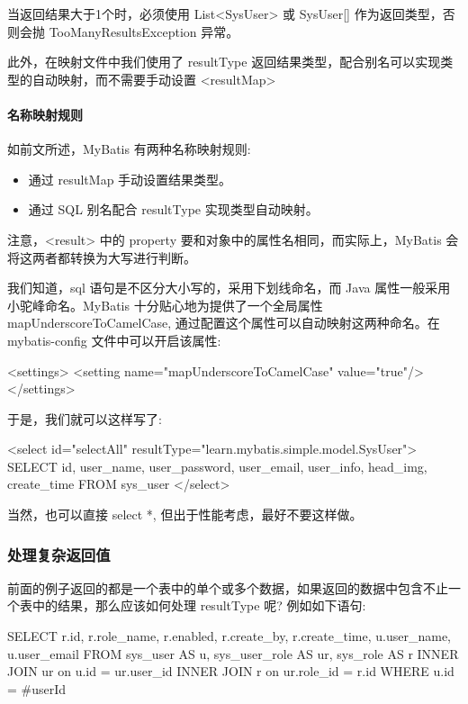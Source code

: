 当返回结果大于1个时，必须使用 List<SysUser> 或 SysUser[] 作为返回类型，否则会抛 TooManyResultsException 异常。 

此外，在映射文件中我们使用了 resultType 返回结果类型，配合别名可以实现类型的自动映射，而不需要手动设置 <resultMap>

\paragraph*{名称映射规则} 如前文所述，MyBatis 有两种名称映射规则:
\begin{itemize}
    \item 通过 resultMap 手动设置结果类型。
    \item 通过 SQL 别名配合 resultType 实现类型自动映射。
\end{itemize}

注意，<result> 中的 property 要和对象中的属性名相同，而实际上，MyBatis 会将这两者都转换为大写进行判断。

我们知道，sql 语句是不区分大小写的，采用下划线命名，而 Java 属性一般采用小驼峰命名。MyBatis 十分贴心地为提供了一个全局属性 mapUnderscoreToCamelCase, 通过配置这个属性可以自动映射这两种命名。在 mybatis-config 文件中可以开启该属性:

\begin{xml}
<settings>
    <setting name="mapUnderscoreToCamelCase" value="true"/>
</settings>
\end{xml}

于是，我们就可以这样写了:
\begin{xml}
<select id="selectAll" resultType="learn.mybatis.simple.model.SysUser">
    SELECT id, user_name, user_password, user_email, user_info, head_img, create_time
    FROM sys_user
</select>
\end{xml}

当然，也可以直接 select *, 但出于性能考虑，最好不要这样做。

\subsubsection{处理复杂返回值}

前面的例子返回的都是一个表中的单个或多个数据，如果返回的数据中包含不止一个表中的结果，那么应该如何处理 resultType 呢? 例如如下语句:

\begin{sql}
SELECT r.id, r.role_name, r.enabled, r.create_by, r.create_time, u.user_name, u.user_email
FROM sys_user AS u,
     sys_user_role AS ur,
     sys_role AS r
         INNER JOIN ur on u.id = ur.user_id
         INNER JOIN r on ur.role_id = r.id
WHERE u.id = #{userId}
\end{sql}

